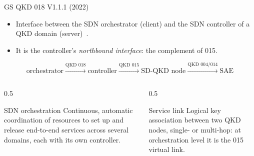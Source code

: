 \documentclass[10pt]{beamer}
\begin{document}
\begin{frame}{GS QKD 018 V1.1.1 (2022)}
  \begin{itemize}
    \item Interface between the \alert{SDN orchestrator} (client) and the
          \alert{SDN controller} of a QKD domain (server)~\cite{qkd018}.
    \item It is the controller's \emph{northbound interface}: the
          complement of 015.
  \end{itemize}
  \[
    \text{orchestrator} \xrightarrow{\text{QKD 018}} \text{controller}
    \xrightarrow{\text{QKD 015}} \text{SD-QKD node}
    \xrightarrow{\text{QKD 004/014}} \text{SAE}
  \]
  \begin{columns}[T]
    \begin{column}{0.5\textwidth}
      \begin{block}{SDN orchestration}
        \small Continuous, automatic coordination of resources to set up
        and release end-to-end services across several domains, each with
        its own controller.
      \end{block}
    \end{column}
    \begin{column}{0.5\textwidth}
      \begin{block}{Service link}
        \small Logical key association between two QKD nodes, single- or
        multi-hop: at orchestration level it is the 015 virtual link.
      \end{block}
    \end{column}
  \end{columns}
\end{frame}
\end{document}
